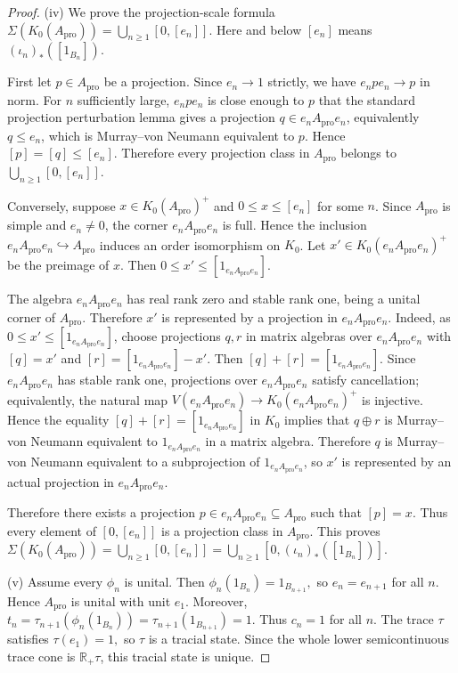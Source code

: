 \documentclass[11pt]{amsart}
\theoremstyle{definition}
\theoremstyle{remark}
\newcommand{\R}{\mathbb{R}}
\newcommand{\ex}{\mathrm{pro}}
\begin{document}
\begin{proof}
\smallskip

\noindent
\textup{(iv)}
We prove the projection-scale formula $\Sigma(K_0(A_{\ex}))=\bigcup_{n\geq1}[0,[e_n]].$
Here and below $[e_n]$ means $(\iota_n)_*([1_{B_n}])$.

First let $p\in A_{\ex}$ be a projection. Since $e_n\to 1$ strictly, we have $e_npe_n\to p$ in norm. For $n$
sufficiently large, $e_npe_n$ is close enough to $p$ that the standard
projection perturbation lemma gives a projection $q\in e_nA_{\ex}e_n$, equivalently
$q\leq e_n$, which is Murray--von Neumann equivalent to $p$. Hence
$
[p]=[q]\leq [e_n].$
Therefore every projection class in $A_{\ex}$ belongs to
$
\bigcup_{n\geq1}[0,[e_n]].$

Conversely, suppose $x\in K_0(A_{\ex})^+$ and
$0\leq x\leq [e_n]$ for some $n$. Since $A_{\ex}$ is simple and $e_n\neq0$, the corner $e_nA_{\ex}e_n$
is full. Hence the inclusion $e_nA_{\ex}e_n\hookrightarrow A_{\ex}$
induces an order isomorphism on $K_0$. Let $x'\in K_0(e_nA_{\ex}e_n)^+$ be the
preimage of $x$. Then $0\leq x'\leq [1_{e_nA_{\ex}e_n}].$

The algebra $e_nA_{\ex}e_n$ has real rank zero and stable rank one, being a unital
corner of $A_{\ex}$. Therefore $x'$ is represented by a projection
in $e_nA_{\ex}e_n$.
Indeed, as $0\leq x'\leq [1_{e_nA_{\ex}e_n}]$, choose projections $q,r$ in matrix
algebras over $e_nA_{\ex}e_n$ with $[q]=x'$ and 
$[r]=[1_{e_nA_{\ex}e_n}]-x'.$
Then $[q]+[r]=[1_{e_nA_{\ex}e_n}].$ Since $e_nA_{\ex}e_n$ has stable rank one, projections over
$e_nA_{\ex}e_n$ satisfy cancellation; equivalently, the natural map $V(e_nA_{\ex}e_n)\to K_0(e_nA_{\ex}e_n)^+$
is injective. Hence the equality $[q]+[r]=[1_{e_nA_{\ex}e_n}]$
in $K_0$ implies that $q\oplus r$ is Murray--von Neumann equivalent to
$1_{e_nA_{\ex}e_n}$ in a matrix algebra. Therefore $q$ is Murray--von
Neumann equivalent to a subprojection of $1_{e_nA_{\ex}e_n}$, so $x'$ is
represented by an actual projection in $e_nA_{\ex}e_n$.

Therefore there exists a projection $p\in e_nA_{\ex}e_n\subseteq A_{\ex}$
such that
$[p]=x.$ Thus every element of $[0,[e_n]]$ is a projection class in $A_{\ex}$. This proves
$
\Sigma(K_0(A_{\ex}))
=\bigcup_{n\geq1}[0,[e_n]]
=\bigcup_{n\geq1}[0,(\iota_n)_*([1_{B_n}])].$

\smallskip

\noindent
\textup{(v)}
Assume every $\phi_n$ is unital. Then
$\phi_n(1_{B_n})=1_{B_{n+1}},$
so $e_n=e_{n+1}$
for all $n$. Hence $A_{\ex}$ is unital with unit $e_1$. Moreover, $t_n
=\tau_{n+1}(\phi_n(1_{B_n}))
=\tau_{n+1}(1_{B_{n+1}})=1.$
Thus $c_n=1$ for all $n$. The trace $\tau$ satisfies
$\tau(e_1)=1,$
so $\tau$ is a tracial state. Since the whole lower semicontinuous trace cone
is $\R_+\tau$, this tracial state is unique.


\end{proof}
\end{document}

